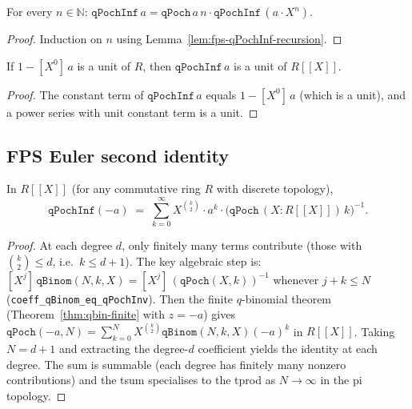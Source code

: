 \begin{lemma}\label{lem:fps-qPochInf-eq-qPoch-mul}\leanok{}
For every $n \in \mathbb{N}$:
$\texttt{qPochInf}\,a = \texttt{qPoch}\,a\,n \cdot \texttt{qPochInf}\,(a\cdot X^n)$.
\end{lemma}

\begin{proof}\leanok Induction on $n$ using Lemma~\ref{lem:fps-qPochInf-recursion}. \end{proof}

\begin{lemma}\label{lem:fps-isUnit-qPochInf}\leanok{}
If $1 - [X^0]\,a$ is a unit of $R$, then $\texttt{qPochInf}\,a$ is a unit
of $R[\![ X]\!]$.
\end{lemma}

\begin{proof}\leanok
The constant term of $\texttt{qPochInf}\,a$ equals $1 - [X^0]\,a$
(which is a unit), and a power series with unit constant term is a unit.
\end{proof}

\subsection{FPS Euler second identity}
\label{subsec:fps-euler2}

\begin{theorem}\label{thm:fps-euler-second}\leanok{}
In $R[\![ X]\!]$ (for any commutative ring $R$ with discrete topology),
\[
  \texttt{qPochInf}(-a)
  \;=\; \sum_{k=0}^{\infty} X^{\binom{k}{2}}\cdot a^k \cdot
        \bigl(\texttt{qPoch}\,(X : R[\![ X]\!])\,k\bigr)^{-1}.
\]
\end{theorem}

\begin{proof}\leanok
At each degree $d$, only finitely many terms contribute (those with
$\binom{k}{2} \le d$, i.e.\ $k \le d+1$). The key algebraic step is:
$[X^j]\,\texttt{qBinom}(N, k, X) = [X^j]\,(\texttt{qPoch}(X,k))^{-1}$
whenever $j + k \le N$ (\texttt{coeff\_qBinom\_eq\_qPochInv}).
Then the finite $q$-binomial theorem
(Theorem~\ref{thm:qbin-finite} with $z = -a$) gives
$\texttt{qPoch}(-a, N) = \sum_{k=0}^{N} X^{\binom{k}{2}} \texttt{qBinom}(N,k,X) (-a)^k$
in $R[\![ X]\!]$. Taking $N = d+1$ and extracting the degree-$d$
coefficient yields the identity at each degree. The sum is summable (each
degree has finitely many nonzero contributions) and the tsum specialises to
the tprod as $N \to \infty$ in the pi topology.
\end{proof}

